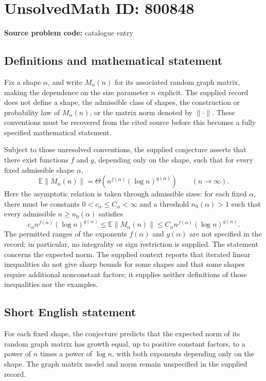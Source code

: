 \documentclass[11pt]{article}
\begin{document}
\section*{UnsolvedMath ID: 800848}
\textbf{Source problem code:} catalogue entry
\subsection{Definitions and mathematical statement}
Fix a shape \(\alpha\), and write \(M_\alpha(n)\) for its associated random graph matrix, making the dependence on the size parameter \(n\) explicit. The supplied record does not define a shape, the admissible class of shapes, the construction or probability law of \(M_\alpha(n)\), or the matrix norm denoted by \(\|\cdot\|\). These conventions must be recovered from the cited source before this becomes a fully specified mathematical statement.

Subject to those unresolved conventions, the supplied conjecture asserts that there exist functions \(f\) and \(g\), depending only on the shape, such that for every fixed admissible shape \(\alpha\),
\[
\mathbb{E}\bigl\|M_\alpha(n)\bigr\|
=\Theta\!\left(n^{f(\alpha)}(\log n)^{g(\alpha)}\right)
\qquad(n\to\infty).
\]
Here the asymptotic relation is taken through admissible sizes: for each fixed \(\alpha\), there must be constants \(0<c_\alpha\le C_\alpha<\infty\) and a threshold \(n_0(\alpha)>1\) such that every admissible \(n\ge n_0(\alpha)\) satisfies
\[
c_\alpha n^{f(\alpha)}(\log n)^{g(\alpha)}
\le \mathbb{E}\bigl\|M_\alpha(n)\bigr\|
\le C_\alpha n^{f(\alpha)}(\log n)^{g(\alpha)}.
\]
The permitted ranges of the exponents \(f(\alpha)\) and \(g(\alpha)\) are not specified in the record; in particular, no integrality or sign restriction is supplied. The statement concerns the expected norm. The supplied context reports that iterated linear inequalities do not give sharp bounds for some shapes and that some shapes require additional nonconstant factors; it supplies neither definitions of those inequalities nor the examples.
\subsection{Short English statement}
For each fixed shape, the conjecture predicts that the expected norm of its random graph matrix has growth equal, up to positive constant factors, to a power of \(n\) times a power of \(\log n\), with both exponents depending only on the shape. The graph matrix model and norm remain unspecified in the supplied record.
\end{document}
